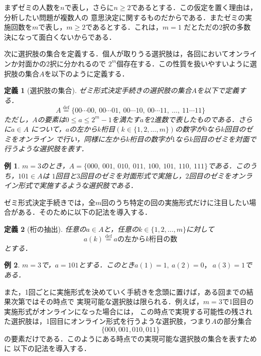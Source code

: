 \documentclass[dvipdfmx]{jsarticle}
\newtheorem{definition}{定義}[section]
\newtheorem{example}{例}[section]
\begin{document}
まずゼミの人数を$n$で表し，さらに$n \geq 2$であるとする．この仮定を置く理由は，分析したい問題が複数人の
意思決定に関するものだからである．またゼミの実施回数を$m$で表し，$m \geq 2$であるとする．これは，$m=1$
だとただの2択の多数決になって面白くないからである．

次に選択肢の集合を定義する．個人が取りうる選択肢は，各回においてオンラインか対面かの2択に分かれるので
$2^m$個存在する．この性質を扱いやすいように選択肢の集合$A$を以下のように定義する．

\begin{definition}[選択肢の集合]
  ゼミ形式決定手続きの選択肢の集合$A$を以下で定義する．
  \[
    A \stackrel{\mathrm{def}}{=} \{00\cdots 00,\ 00\cdots 01,\ 00\cdots 10,\ 00\cdots 11,\
    \ldots,\ 11\cdots 11\}
  \]
  ただし，$A$の要素は$0 \leq a \leq 2^m-1$を満たす$a$を$2$進数で表したものである．さらに$a \in A$
  について，$a$の左から$k$桁目$(k \in \{1,2,\ldots,m \})$の数字が$0$なら$k$回目のゼミをオンライン
  で行い，同様に左から$k$桁目の数字が$1$なら$k$回目のゼミを対面で行うような選択肢を表す．
\end{definition}

\begin{example}
  $m=3$のとき，$A = \{000,\ 001,\ 010,\ 011,\ 100,\ 101,\ 110,\ 111 \}$である．このうち，$101 \in A$は
  $1$回目と$3$回目のゼミを対面形式で実施し，$2$回目のゼミをオンライン形式で実施するような選択肢である．
\end{example}

ゼミ形式決定手続きでは，全$m$回のうち特定の回の実施形式だけに注目したい場合がある．そのために以下の記法を導入する．

\begin{definition}[桁の抽出]
  任意の$a \in A$と，任意の$k \in \{1,2,\ldots,m \}$に対して
  \[
    a(k) \stackrel{\mathrm{def}}{=} a\text{の左から}k\text{桁目の数}
  \]
  とする．
\end{definition}

\begin{example}
  $m = 3$で，$a = 101$とする．このとき$a(1) = 1,\ a(2)=0，\ a(3)=1$である．
\end{example}

また，1回ごとに実施形式を決めていく手続きを念頭に置けば，ある回までの結果次第ではその時点で
実現可能な選択肢は限られる．例えば，$m=3$で1回目の実施形式がオンラインになった場合には，
この時点で実現する可能性の残された選択肢は，1回目にオンライン形式を行うような選択肢，つまり$A$の部分集合
\[
  \{000, 001, 010, 011 \}
\]
の要素だけである．このようにある時点での実現可能な選択肢の集合を表すために
以下の記法を導入する．
\end{document}
